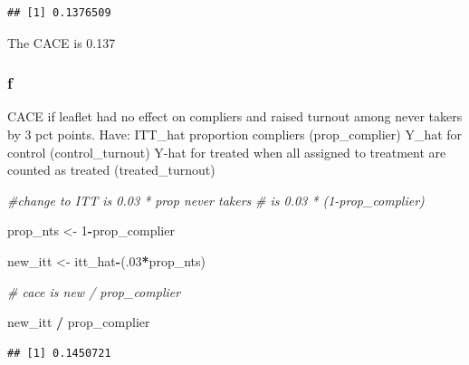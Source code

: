 \documentclass[
]{article}
\newenvironment{Shaded}{\begin{snugshade}}{\end{snugshade}}
\newcommand{\CommentTok}[1]{\textcolor[rgb]{0.56,0.35,0.01}{\textit{#1}}}
\newcommand{\DecValTok}[1]{\textcolor[rgb]{0.00,0.00,0.81}{#1}}
\newcommand{\FunctionTok}[1]{\textcolor[rgb]{0.13,0.29,0.53}{\textbf{#1}}}
\newcommand{\NormalTok}[1]{#1}
\newcommand{\OtherTok}[1]{\textcolor[rgb]{0.56,0.35,0.01}{#1}}
\newcommand{\SpecialCharTok}[1]{\textcolor[rgb]{0.81,0.36,0.00}{\textbf{#1}}}
\begin{document}
\begin{Shaded}
\end{Shaded}

\begin{verbatim}
## [1] 0.1376509
\end{verbatim}

The CACE is 0.137

\subsubsection{f}\label{f}

CACE if leaflet had no effect on compliers and raised turnout among
never takers by 3 pct points. Have: ITT\_hat proportion compliers
(prop\_complier) Y\_hat for control (control\_turnout) Y-hat for treated
when all assigned to treatment are counted as treated (treated\_turnout)

\begin{Shaded}
\begin{Highlighting}[]
\CommentTok{\#change to ITT is 0.03 * prop never takers}
\CommentTok{\# is 0.03 * (1{-}prop\_complier)}

\NormalTok{prop\_nts }\OtherTok{\textless{}{-}} \DecValTok{1}\SpecialCharTok{{-}}\NormalTok{prop\_complier}

\NormalTok{new\_itt }\OtherTok{\textless{}{-}}\NormalTok{ itt\_hat}\SpecialCharTok{{-}}\NormalTok{(.}\DecValTok{03}\SpecialCharTok{*}\NormalTok{prop\_nts)}

\CommentTok{\# cace is new / prop\_complier}

\NormalTok{new\_itt }\SpecialCharTok{/}\NormalTok{ prop\_complier}
\end{Highlighting}
\end{Shaded}

\begin{verbatim}
## [1] 0.1450721
\end{verbatim}
\end{document}
